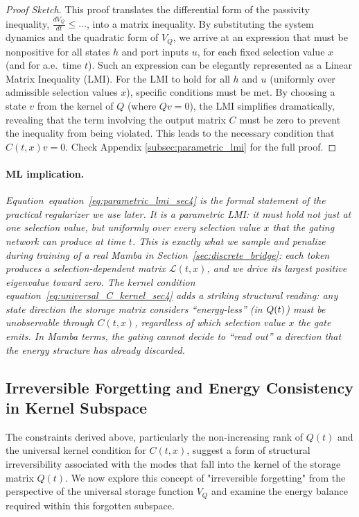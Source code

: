 \documentclass[10pt]{article} %
\def\eqref#1{equation~\ref{#1}}
\let\ker\relax\DeclareMathOperator{\ker}{Ker}           %
\theoremstyle{definition}
\begin{document}
\begin{proof}[Proof Sketch]
This proof translates the differential form of the passivity inequality, $\frac{dV_Q}{dt} \le \dots$, into a matrix inequality. By substituting the system dynamics and the quadratic form of $V_Q$, we arrive at an expression that must be nonpositive for all states $h$ and port inputs $u$, for each fixed selection value $x$ (and for a.e.\ time $t$). Such an expression can be elegantly represented as a Linear Matrix Inequality (LMI). For the LMI to hold for all $h$ and $u$ (uniformly over admissible selection values $x$), specific conditions must be met. By choosing a state $v$ from the kernel of $Q$ (where $Qv=0$), the LMI simplifies dramatically, revealing that the term involving the output matrix $C$ must be zero to prevent the inequality from being violated. This leads to the necessary condition that $C(t,x)v = 0$.
Check Appendix \ref{subsec:parametric_lmi} for the full proof.
\end{proof}

\paragraph{ML implication.} \textit{Equation~\eqref{eq:parametric_lmi_sec4} is the formal statement of the practical regularizer we use later. It is a parametric LMI: it must hold not just at one selection value, but uniformly over every selection value $x$ that the gating network can produce at time $t$. This is exactly what we sample and penalize during training of a real Mamba in Section~\ref{sec:discrete_bridge}: each token produces a selection-dependent matrix $\mathcal{L}(t,x)$, and we drive its largest positive eigenvalue toward zero. The kernel condition \eqref{eq:universal_C_kernel_sec4} adds a striking structural reading: any state direction the storage matrix considers ``energy-less'' (in $\ker Q(t)$) must be unobservable through $C(t,x)$, regardless of which selection value $x$ the gate emits. In Mamba terms, the gating cannot decide to ``read out'' a direction that the energy structure has already discarded.}

\subsection{Irreversible Forgetting and Energy Consistency in Kernel Subspace}
The constraints derived above, particularly the non-increasing rank of $Q(t)$ and the universal kernel condition for $C(t,x)$, suggest a form of structural irreversibility associated with the modes that fall into the kernel of the storage matrix $Q(t)$. We now explore this concept of "irreversible forgetting" from the perspective of the universal storage function $V_Q$ and examine the energy balance required within this forgotten subspace.
\end{document}
